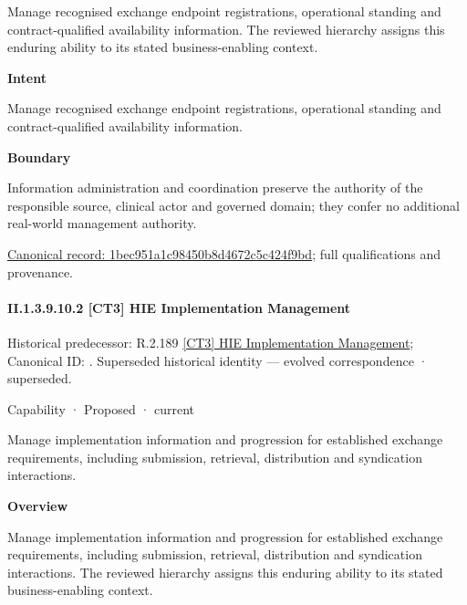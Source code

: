 Manage recognised exchange endpoint registrations, operational standing and contract-qualified availability information. The reviewed hierarchy assigns this enduring ability to its stated business-enabling context.



\textbf{Intent}



Manage recognised exchange endpoint registrations, operational standing and contract-qualified availability information.



\textbf{Boundary}



Information administration and coordination preserve the authority of the responsible source, clinical actor and governed domain; they confer no additional real-world management authority.


{\footnotesize \href{../../../../continuum/strategy/capability/1bec951a1c98450b8d4672c5c424f9bd.md}{Canonical record: 1bec951a1c98450b8d4672c5c424f9bd}; full qualifications and provenance.}\par
\paragraph*{II.1.3.9.10.2 [CT3] HIE Implementation Management}
\label{navigation:II.1.3.9.10.2}

{\small Historical predecessor: R.2.189 \hyperref[element:a99b4119339545a89dc54ebb216ddb85]{[CT3] HIE Implementation Management}; Canonical ID: \texttt{}. Superseded historical identity — evolved correspondence · superseded.}\par
\label{element:8ce29be373e04252b7aa881b6a72f375}
{\small Capability · Proposed · current}\par

Manage implementation information and progression for established exchange requirements, including submission, retrieval, distribution and syndication interactions.



\textbf{Overview}



Manage implementation information and progression for established exchange requirements, including submission, retrieval, distribution and syndication interactions. The reviewed hierarchy assigns this enduring ability to its stated business-enabling context.



